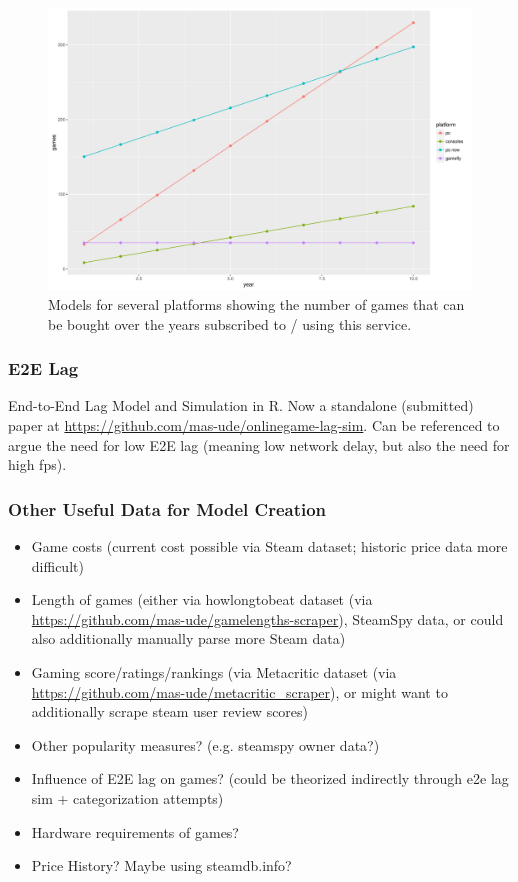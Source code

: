 \begin{figure}[!t]
	\centering
	\includegraphics[width=1.0\columnwidth]{images/games-over-year.pdf}
	\caption{Models for several platforms showing the number of games that can be bought over the years subscribed to / using this service.}
\label{fig:games-over-years}
\end{figure}


\subsubsection{E2E Lag}
End-to-End Lag Model and Simulation in R. Now a standalone (submitted) paper at \url{https://github.com/mas-ude/onlinegame-lag-sim}. Can be referenced to argue the need for low E2E lag (meaning low network delay, but also the need for high fps).


\subsubsection{Other Useful Data for Model Creation}

\begin{itemize}
	\item Game costs (current cost possible via Steam dataset; historic price data more difficult)
	\item Length of games (either via howlongtobeat dataset (via \url{https://github.com/mas-ude/gamelengths-scraper}), SteamSpy data, or could also additionally manually parse more Steam data)
	\item Gaming score/ratings/rankings (via Metacritic dataset (via \url{https://github.com/mas-ude/metacritic_scraper}), or might want to additionally scrape steam user review scores)
	\item Other popularity measures? (e.g. steamspy owner data?)
	\item Influence of E2E lag on games? (could be theorized indirectly through e2e lag sim + categorization attempts)
	\item Hardware requirements of games?

	\item Price History? Maybe using steamdb.info?
\end{itemize}


